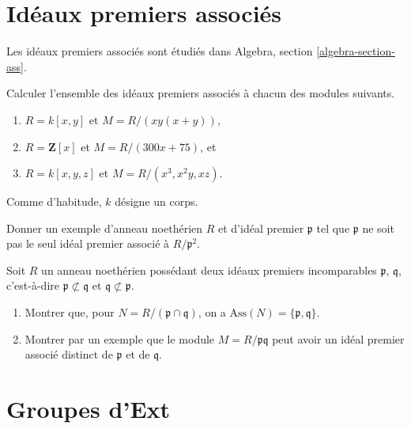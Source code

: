 \section{Idéaux premiers associés}
\label{section-ass}

\noindent
Les idéaux premiers associés sont étudiés dans
Algebra, section \ref{algebra-section-ass}.

\begin{exercise}
\label{exercise-compute-ass}
Calculer l'ensemble des idéaux premiers associés à chacun des modules suivants.
\begin{enumerate}
\item $R = k[x, y]$ et $M = R/(xy(x + y))$,
\item $R = \mathbf{Z}[x]$ et $M = R/(300x + 75)$, et
\item $R = k[x, y, z]$ et $M = R/(x^3, x^2y, xz)$.
\end{enumerate}
Comme d'habitude, $k$ désigne un corps.
\end{exercise}

\begin{exercise}
\label{exercise-prime-power-not-primary}
Donner un exemple d'anneau noethérien $R$ et d'idéal premier $\mathfrak p$
tel que $\mathfrak p$ ne soit pas le seul idéal premier associé à $R/\mathfrak p^2$.
\end{exercise}

\begin{exercise}
\label{exercise-product-primes-not-only-associated}
Soit $R$ un anneau noethérien possédant deux idéaux premiers incomparables
$\mathfrak p$, $\mathfrak q$, c'est-à-dire $\mathfrak p \not \subset \mathfrak q$
et $\mathfrak q \not \subset \mathfrak p$.
\begin{enumerate}
\item Montrer que, pour $N = R/(\mathfrak p \cap \mathfrak q)$,
on a $\text{Ass}(N) = \{\mathfrak p, \mathfrak q\}$.
\item Montrer par un exemple que le module
$M = R/\mathfrak p \mathfrak q$ peut
avoir un idéal premier associé distinct de $\mathfrak p$ et de $\mathfrak q$.
\end{enumerate}
\end{exercise}





\section{Groupes d'Ext}
\label{section-ext}

